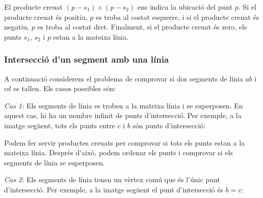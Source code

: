 El producte creuat $(p-s_1) \times (p-s_2)$ ens indica la ubicació del
punt $p$. Si el producte creuat és positiu, $p$ es troba al costat
esquerre, i si el producte creuat és negatiu, $p$ es troba al costat
dret. Finalment, si el producte creuat és zero, els punts $s_1$, $s_2$
i $p$ estan a la mateixa línia.

\subsubsection{Intersecció d'un segment amb una línia}


A continuació considerem el problema de comprovar si dos segments de
línia $ab$ i $cd$ es tallen. Els casos possibles són:

\textit{Cas 1:} Els segments de línia es troben a la mateixa línia i
se superposen. En aquest cas, hi ha un nombre infinit de punts
d'intersecció. Per exemple, a la imatge següent, tots els punts entre
$c$ i $b$ són punts d'intersecció:
\begin{center}
\end{center}


Podem fer servir productes creuats per comprovar si tots els punts
estan a la mateixa línia. Després d'això, podem ordenar els punts i
comprovar si els segments de línia se superposen.

\textit{Cas 2:} Els segments de línia tenen un vèrtex comú que és
l'únic punt d'intersecció. Per exemple, a la imatge següent el punt
d'intersecció és $b=c$:


\begin{center}
\end{center}



